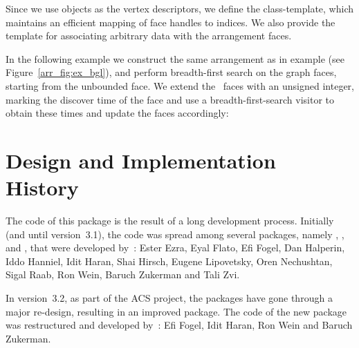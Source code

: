 Since we use  objects as the vertex descriptors, we define
the  class-template, which maintains an
efficient mapping of face handles to indices. We also provide the template
 for associating arbitrary
data with the arrangement faces.

In the following example we construct the same arrangement as in
example  (see Figure~\ref{arr_fig:ex_bgl}),
and perform breadth-first search on the graph faces, starting from the
unbounded face. We extend the \dcel\ faces
with an unsigned integer, marking the discover time of the face and use a
breadth-first-search visitor to obtain these times and update the faces
accordingly:


\section*{Design and Implementation History}
%
The code of this package is the result of a long development process.
Initially (and until version~3.1), the code was spread among several
packages, namely , ,
 and , that were
developed by~: \newline
Ester Ezra, Eyal Flato, Efi Fogel, Dan Halperin, Iddo Hanniel, Idit Haran,
Shai Hirsch, Eugene Lipovetsky, Oren Nechushtan, Sigal Raab, Ron Wein,
Baruch Zukerman and Tali Zvi.

In version~3.2, as part of the ACS project, the packages have gone through
a major re-design, resulting in an improved  package.
The code of the new package was restructured and developed by~: \newline
Efi Fogel, Idit Haran, Ron Wein and Baruch Zukerman.
